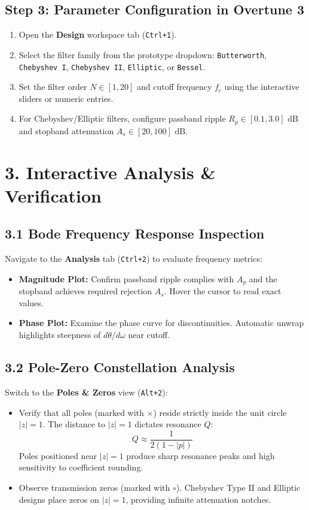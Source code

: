 \documentclass[11pt,a4paper]{article}
\begin{document}
\subsection*{Step 3: Parameter Configuration in Overtune 3}
\begin{enumerate}[leftmargin=20pt,itemsep=2pt]
\item Open the \textbf{Design} workspace tab (\texttt{Ctrl+1}).
\item Select the filter family from the prototype dropdown: \texttt{Butterworth}, \texttt{Chebyshev I}, \texttt{Chebyshev II}, \texttt{Elliptic}, or \texttt{Bessel}.
\item Set the filter order $N \in [1, 20]$ and cutoff frequency $f_c$ using the interactive sliders or numeric entries.
\item For Chebyshev/Elliptic filters, configure passband ripple $R_p \in [0.1, 3.0]\text{ dB}$ and stopband attenuation $A_s \in [20, 100]\text{ dB}$.
\end{enumerate}

\section*{3. Interactive Analysis \& Verification}

\subsection*{3.1 Bode Frequency Response Inspection}
Navigate to the \textbf{Analysis} tab (\texttt{Ctrl+2}) to evaluate frequency metrics:
\begin{itemize}[leftmargin=20pt,itemsep=2pt]
\item \textbf{Magnitude Plot:} Confirm passband ripple complies with $A_p$ and the stopband achieves required rejection $A_s$. Hover the cursor to read exact values.
\item \textbf{Phase Plot:} Examine the phase curve for discontinuities. Automatic unwrap highlights steepness of $d\theta/d\omega$ near cutoff.
\end{itemize}

\subsection*{3.2 Pole-Zero Constellation Analysis}
Switch to the \textbf{Poles \& Zeros} view (\texttt{Alt+2}):
\begin{itemize}[leftmargin=20pt,itemsep=2pt]
\item Verify that all poles (marked with $\times$) reside strictly inside the unit circle $|z| = 1$. The distance to $|z| = 1$ dictates resonance $Q$:
\begin{equation}
Q \approx \frac{1}{2(1 - |p|)}
\end{equation}
Poles positioned near $|z| = 1$ produce sharp resonance peaks and high sensitivity to coefficient rounding.
\item Observe transmission zeros (marked with $\circ$). Chebyshev Type II and Elliptic designs place zeros on $|z|=1$, providing infinite attenuation notches.
\end{itemize}
\end{document}
